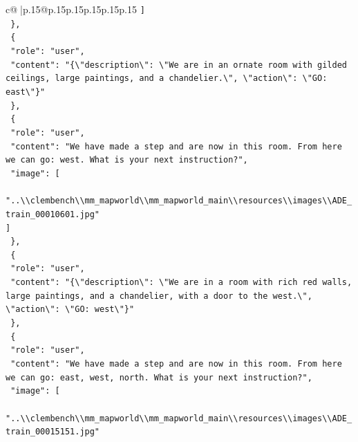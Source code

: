 \documentclass{article}
\begin{document}
{\begin{supertabular}{c@{$\;$}|p{.15\linewidth}@{}p{.15\linewidth}p{.15\linewidth}p{.15\linewidth}p{.15\linewidth}p{.15\linewidth}}
{{{\texttt{    {]}} \\
\texttt{  \},} \\
\texttt{  \{} \\
\texttt{    "role": "user",} \\
\texttt{    "content": "\{\textbackslash{}"description\textbackslash{}": \textbackslash{}"We are in an ornate room with gilded ceilings, large paintings, and a chandelier.\textbackslash{}", \textbackslash{}"action\textbackslash{}": \textbackslash{}"GO: east\textbackslash{}"\}"} \\
\texttt{  \},} \\
\texttt{  \{} \\
\texttt{    "role": "user",} \\
\texttt{    "content": "We have made a step and are now in this room. From here we can go: west. What is your next instruction?",} \\
\texttt{    "image": {[}} \\
\texttt{      "..\textbackslash{}\textbackslash{}clembench\textbackslash{}\textbackslash{}mm\_mapworld\textbackslash{}\textbackslash{}mm\_mapworld\_main\textbackslash{}\textbackslash{}resources\textbackslash{}\textbackslash{}images\textbackslash{}\textbackslash{}ADE\_train\_00010601.jpg"} \\
\texttt{    {]}} \\
\texttt{  \},} \\
\texttt{  \{} \\
\texttt{    "role": "user",} \\
\texttt{    "content": "\{\textbackslash{}"description\textbackslash{}": \textbackslash{}"We are in a room with rich red walls, large paintings, and a chandelier, with a door to the west.\textbackslash{}", \textbackslash{}"action\textbackslash{}": \textbackslash{}"GO: west\textbackslash{}"\}"} \\
\texttt{  \},} \\
\texttt{  \{} \\
\texttt{    "role": "user",} \\
\texttt{    "content": "We have made a step and are now in this room. From here we can go: east, west, north. What is your next instruction?",} \\
\texttt{    "image": {[}} \\
\texttt{      "..\textbackslash{}\textbackslash{}clembench\textbackslash{}\textbackslash{}mm\_mapworld\textbackslash{}\textbackslash{}mm\_mapworld\_main\textbackslash{}\textbackslash{}resources\textbackslash{}\textbackslash{}images\textbackslash{}\textbackslash{}ADE\_train\_00015151.jpg"} \\
}}}
\end{supertabular}}
\end{document}
